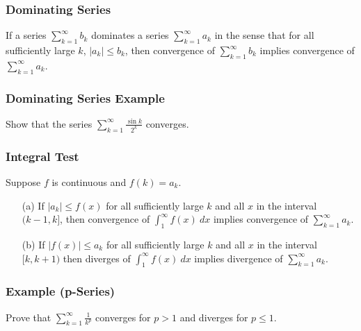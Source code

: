 \documentclass{beamer}
\begin{document}
 
 \begin{frame}
 \frametitle{Dominating Series}
 
 \begin{Theorem}
 If a series $\displaystyle\sum_{k = 1}^\infty b_k$ dominates a series $\displaystyle\sum_{k = 1}^\infty a_k$ in the sense that for all sufficiently large $k$, $|a_k| \leq b_k$, then convergence of $\displaystyle\sum_{k = 1}^\infty b_k$ implies convergence of $\displaystyle\sum_{k = 1}^\infty a_k$.
 \end{Theorem}
 
 \end{frame}
 
 \begin{frame}[t]
  \frametitle{Dominating Series Example}
  \begin{Example} 
  Show that the series $\displaystyle\sum_{k = 1}^\infty \frac{\sin k}{2^k}$ converges.
  \end{Example}
 
 \end{frame}
 
 \begin{frame}
  \frametitle{Integral Test}
  
  \begin{Theorem}
 Suppose $f$ is continuous and $f(k) = a_k$.
\begin{enumerate}
\item[(a)] If $|a_k| \leq f(x)$ for all sufficiently large $k$ and all $x$ in the interval $(k - 1, k]$, then convergence of $\displaystyle\int_1^\infty f(x)\ dx$ implies convergence of $\displaystyle\sum_{k = 1}^\infty a_k$.
\item[(b)] If $|f(x)| \leq a_k$ for all sufficiently large $k$ and all $x$ in the interval $[k, k+1)$ then diverges of $\displaystyle\int_1^\infty f(x)\ dx$ implies divergence of $\displaystyle\sum_{k = 1}^\infty a_k$.
\end{enumerate}
\end{Theorem}
  
  \end{frame}
  
  \begin{frame}[t]
  \frametitle{Example (p-Series)}
  \begin{Example}
  Prove that $\displaystyle\sum_{k = 1}^\infty \frac{1}{k^p}$ converges for $p > 1$ and diverges for $p\leq 1$.
  \end{Example}
  
  \end{frame}
  
\end{document}
